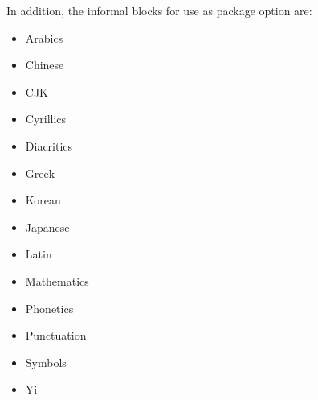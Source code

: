 ﻿\documentclass{article}
\newenvironment{itemlist}{%
  \begin{itemize}
	\setlength{\itemsep}{0pt}
	\setlength{\parsep}{0pt}
	\setlength{\topsep}{0pt}
	\setlength{\partopsep}{0pt}
	\setlength{\parskip}{0pt}
	\setlength{\labelsep}{5pt}}%
{
  \end{itemize}}
\begin{document}
		In addition, the informal blocks for use as package option are:

		\begin{itemlist}
			\item Arabics
			\item Chinese
			\item CJK
			\item Cyrillics
			\item Diacritics
			\item Greek
			\item Korean
			\item Japanese
			\item Latin
			\item Mathematics
			\item Phonetics
			\item Punctuation
			\item Symbols
			\item Yi
		\end{itemlist}
\end{document}
